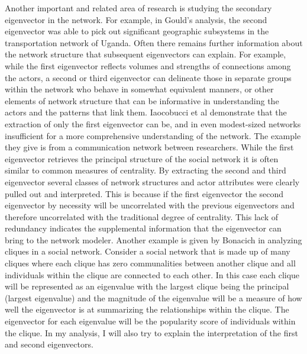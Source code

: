 \documentclass{article}
\theoremstyle{definition}
\theoremstyle{remark}
\begin{document}
Another important and related area of research is studying the secondary eigenvector in the network.  For example, in Gould’s analysis, the second eigenvector was able to pick out significant geographic subsystems in the transportation network of Uganda.  Often there remains further information about the network structure that subsequent eigenvectors can explain. For example, while the first eigenvector reflects volumes and strengths of connections among the actors, a second or third eigenvector can delineate those in separate groups within the network who behave in somewhat equivalent manners, or other elements of network structure that can be informative in understanding the actors and the patterns that link them.  Iaocobucci et al demonstrate that the extraction of only the first eigenvector can be, and in even modest-sized networks insufficient for a more comprehensive understanding of the network.\cite{iacobucci2017eigenvector}  The example they give is from a communication network between researchers.  While the first eigenvector retrieves the principal structure of the social network it is often similar to common measures of centrality.  By extracting the second and third eigenvector several classes of network structures and actor attributes were clearly pulled out and interpreted.  This is because if the first eigenvector the second eigenvector by necessity will be uncorrelated with the previous eigenvectors and therefore uncorrelated with the traditional degree of centrality.  This lack of redundancy indicates the supplemental information that the eigenvector can bring to the network modeler.  Another example is given by Bonacich \cite{bonacich1972factoring} in analyzing cliques in a social network.  Consider a social network that is made up of many cliques where each clique has zero communalities between another clique and all individuals within the clique are connected to each other.  In this case each clique will be represented as an eigenvalue with the largest clique being the principal (largest eigenvalue) and the magnitude of the eigenvalue will be a measure of how well the eigenvector is at summarizing the relationships within the clique.  The eigenvector for each eigenvalue will be the popularity score of individuals within the clique.  In my analysis, I will also try to explain the interpretation of the first and second eigenvectors.
\end{document}
